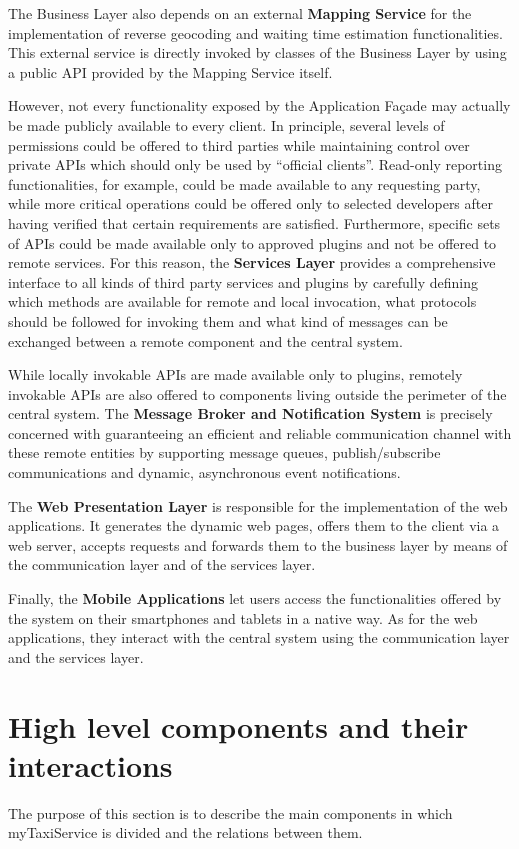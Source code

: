 The Business Layer also depends on an external \textbf{Mapping Service} for the implementation of reverse geocoding and waiting time estimation functionalities. This external service is directly invoked by classes of the Business Layer by using a public API provided by the Mapping Service itself. 

However, not every functionality exposed by the Application Façade may actually be made publicly available to every client. In principle, several levels of permissions could be offered to third parties while maintaining control over private APIs which should only be used by ``official clients''. Read-only reporting functionalities, for example, could be made available to any requesting party, while more critical operations could be offered only to selected developers after having verified that certain requirements are satisfied. Furthermore, specific sets of APIs could be made available only to approved plugins and not be offered to remote services. For this reason, the \textbf{Services Layer} provides a comprehensive interface to all kinds of third party services and plugins by carefully defining which methods are available for remote and local invocation, what protocols should be followed for invoking them and what kind of messages can be exchanged between a remote component and the central system.

While locally invokable APIs are made available only to plugins, remotely invokable APIs are also offered to components living outside the perimeter of the central system. The \textbf{Message Broker and Notification System} is precisely concerned with guaranteeing an efficient and reliable communication channel with these remote entities by supporting message queues, publish/subscribe communications and dynamic, asynchronous event notifications.

The \textbf{Web Presentation Layer} is responsible for the implementation of the web applications. It generates the dynamic web pages, offers them to the client via a web server, accepts requests and forwards them to the business layer by means of the communication layer and of the services layer. 

Finally, the \textbf{Mobile Applications} let users access the functionalities offered by the system on their smartphones and tablets in a native way. As for the web applications, they interact with the central system using the communication layer and the services layer.
  
\section{High level components and their interactions}
The purpose of this section is to describe the main components in which myTaxiService is divided and the relations between them.

